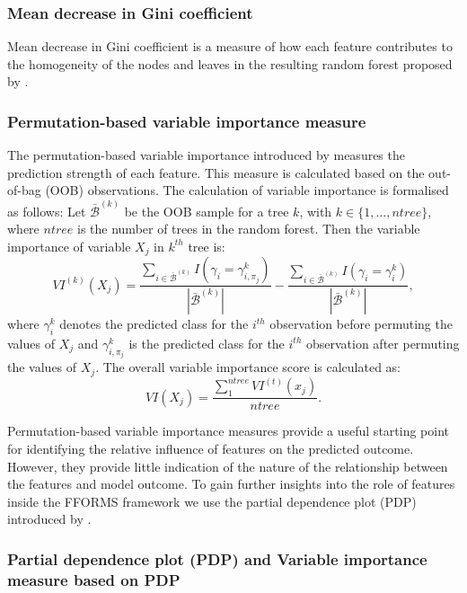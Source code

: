 \documentclass[11pt,a4paper,]{article}
\begin{document}
\hypertarget{mean-decrease-in-gini-coefficient}{%
\subsubsection{Mean decrease in Gini coefficient}\label{mean-decrease-in-gini-coefficient}}

Mean decrease in Gini coefficient is a measure of how each feature contributes to the homogeneity of the nodes and leaves in the resulting random forest proposed by \textcite{breiman2001random}.

\hypertarget{permutation-based-variable-importance-measure}{%
\subsubsection{Permutation-based variable importance measure}\label{permutation-based-variable-importance-measure}}

The permutation-based variable importance introduced by \textcite{breiman2001random} measures the prediction
strength of each feature. This measure is calculated based on the out-of-bag (OOB) observations. The calculation of variable importance is formalised as follows: Let \(\bar{\mathcal{B}}^{(k)}\) be the OOB sample for a tree \(k\), with \(k\in \{1,...,ntree\}\), where \(ntree\) is the number of trees in the random forest. Then the variable importance of variable \(X_{j}\) in \(k^{th}\) tree is:
\[VI^{(k)}(X_{j})=\frac{\sum_{i\in \bar{\mathcal{B}}^{(k)}}I(\gamma_{i}=\gamma_{i,\pi_{j}}^{k})}{|\bar{\mathcal{B}}^{(k)}|}-\frac{\sum_{i\in \bar{\mathcal{B}}^{(k)}}I(\gamma_{i}=\gamma_{i}^{k})}{|\bar{\mathcal{B}}^{(k)}|},\]
where \(\gamma_{i}^{k}\) denotes the predicted class for the \(i^{th}\) observation before permuting the values of \(X_{j}\) and \(\gamma_{i, \pi_{j}}^{k}\) is the predicted class for the \(i^{th}\) observation after permuting the values of \(X_{j}\). The overall variable importance score is calculated as:
\[VI(X_{j})=\frac{\sum_{1}^{ntree}VI^{(t)}(x_{j})}{ntree}.\]

Permutation-based variable importance measures provide a useful starting point for identifying the relative influence of features on the predicted outcome. However, they provide little indication of the nature of the relationship between the features and model outcome. To gain further insights into the role of features inside the FFORMS framework we use the partial dependence plot (PDP) introduced by \textcite{friedman2008predictive}.

\hypertarget{partial-dependence-plot-pdp-and-variable-importance-measure-based-on-pdp}{%
\subsubsection{Partial dependence plot (PDP) and Variable importance measure based on PDP}\label{partial-dependence-plot-pdp-and-variable-importance-measure-based-on-pdp}}
\end{document}
